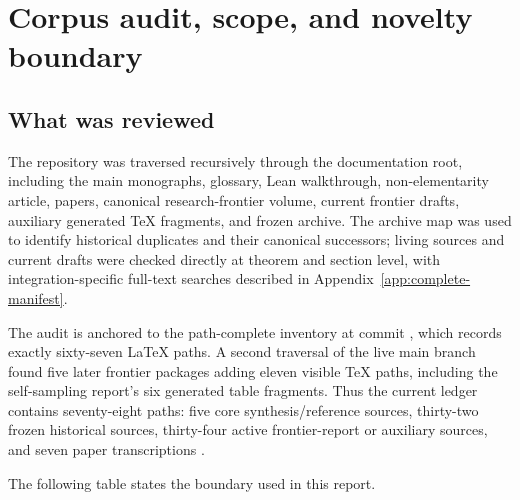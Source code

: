 \documentclass[11pt,oneside]{article}
\theoremstyle{definition}
\begin{document}
\tableofcontents
\bigskip

\section{Corpus audit, scope, and novelty boundary}

\subsection{What was reviewed}

The repository was traversed recursively through the documentation root, including the
main monographs, glossary, Lean walkthrough, non-elementarity article, papers, canonical
research-frontier volume, current frontier drafts, auxiliary generated TeX fragments, and
frozen archive.  The archive map was used to identify historical duplicates and their
canonical successors; living sources and current drafts were checked directly at theorem
and section level, with integration-specific full-text searches described in
Appendix~\ref{app:complete-manifest}.

The audit is anchored to the path-complete inventory at commit
, which records exactly sixty-seven
LaTeX paths.  A second traversal of the live main branch found five later frontier packages
adding eleven visible TeX paths, including the self-sampling report's six generated table
fragments.  Thus the current ledger contains seventy-eight paths: five core
synthesis/reference sources, thirty-two frozen historical sources, thirty-four active
frontier-report or auxiliary sources, and seven paper transcriptions
\cite{ProveIt,ProveItFrontiers,ProveItInventory}.

The following table states the boundary used in this report.
\end{document}
